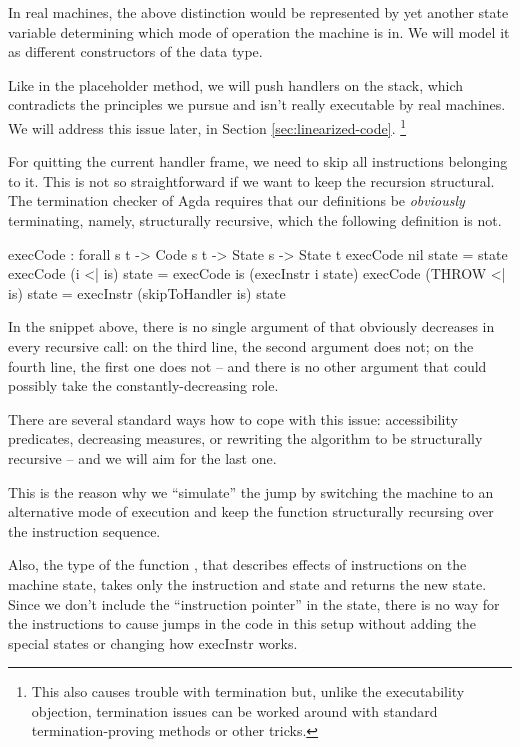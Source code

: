 In real machines, the above distinction would be represented by yet another
state variable determining which mode of operation the machine is in.
We will model it as different constructors of the  data type.

Like in the placeholder method, we will push handlers on the stack, which
contradicts the principles we pursue and isn't really executable by real
machines. We will address this issue later, in Section \ref{sec:linearized-code}.%
\footnote{This also causes trouble with termination but, unlike the
executability objection, termination issues can be worked around with
standard termination-proving methods or other tricks.}

For quitting the current handler frame, we need to skip all instructions
belonging to it. This is not so straightforward if we want to keep the
recursion structural. The termination checker of Agda requires that our
definitions be \emph{obviously} terminating, namely, structurally recursive,
which the following definition is not.
\begin{code}
  execCode : forall {s t} -> Code s t -> State s -> State t
  execCode nil state = state
  execCode (i <| is) state = execCode is (execInstr i state)
  execCode (THROW <| is) state = execInstr (skipToHandler is) state
\end{code}
In the snippet above, there is no single argument of  that
obviously decreases in every recursive call: on the third line, the second
argument does not; on the fourth line, the first one does not -- and there
is no other argument that could possibly take the constantly-decreasing role.

There are several standard ways how to cope with this issue: accessibility
predicates, decreasing measures, or rewriting the algorithm to be
structurally recursive -- and we will aim for the last one.

This is the reason why we ``simulate'' the jump by switching the machine to an
alternative mode of execution and keep the function 
structurally recursing over the instruction sequence.

Also, the type of the function , that describes effects of
instructions on the machine state, takes only the instruction and state and
returns the new state. Since we don't include the ``instruction pointer'' in
the state, there is no way for the instructions to cause jumps in the code in
this setup without adding the special states or changing how execInstr works.

